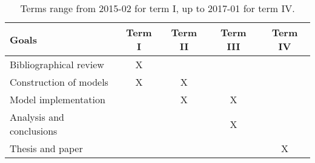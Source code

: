 \documentclass[a4,useAMS,usenatbib,usegraphicx,12pt]{article}
\begin{document}
\begin{table}[h]
\begin{flushleft}
\begin{center}
  \begin{tabular}{l  c c c c } \hline\hline
	\centering\textbf{Goals} & \textbf{Term I} & \textbf{Term II} & 
	\textbf{Term III} & \textbf{Term IV} \\ \hline\hline
	
	 Bibliographical review & X & & & \\
	 Construction of models & X & X & & \\
	 Model implementation &  & X & X & \\
	 Analysis and conclusions &  &  & X & \\
	 Thesis and paper &  &  &  & X \\
	\hline\hline
  \end{tabular}  
  \caption{ Terms range from 2015-02 for term I, up to 2017-01 for term IV.}
\end{center}
\end{flushleft}
\end{table}


\renewcommand{\bibname}{11\ \ \ \ Bibliography}
\small

\end{document}
